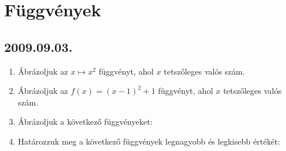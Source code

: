 \section{Függvények}

\subsection*{2009.09.03.}
\begin{enumerate}
\item Ábrázoljuk az $x\mapsto x^2$ függvényt, ahol $x$ tetszőleges valós szám.
\item Ábrázoljuk az $f(x)=(x-1)^2+1$ függvényt, ahol $x$ tetszőleges valós szám.
\item Ábrázoljuk a következő függvényeket:
\item Határozzuk meg a következő függvények legnagyobb és legkisebb értékét:
\end{enumerate}

